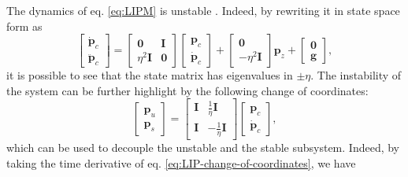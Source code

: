 The dynamics of eq. \eqref{eq:LIPM} is unstable \cite{Scianca2020TRO}. Indeed,
by rewriting it in state space form as
\begin{equation}
    \label{eq:LIPM-state-space}
    \begin{bmatrix}
        \dot{\bm{p}}_c \\ \ddot{\bm{p}}_c
    \end{bmatrix}
    =
    \begin{bmatrix}
        \bm{0}        & \bm{I} \\
        \eta^2 \bm{I} & \bm{0}
    \end{bmatrix}
    \begin{bmatrix}
        \bm{p}_c \\ \dot{\bm{p}}_c
    \end{bmatrix}
    +
    \begin{bmatrix}
        \bm{0} \\ -\eta^2 \bm{I}
    \end{bmatrix}
    \bm{p}_z 
    +
    \begin{bmatrix}
        \bm{0} \\ \bm{g}
    \end{bmatrix},
\end{equation}
it is possible to see that the state matrix has eigenvalues in $\pm\eta$.
The instability of the system
can be further highlight by the following change of coordinates:
\begin{equation}
    \label{eq:LIP-change-of-coordinates}
    \begin{bmatrix}
        \bm{p}_u \\ \bm{p}_s
    \end{bmatrix}
    =
    \begin{bmatrix}
        \bm{I} &  \frac{1}{\eta} \bm{I} \\
        \bm{I} & -\frac{1}{\eta} \bm{I}
    \end{bmatrix}
    \begin{bmatrix}
        \bm{p}_c\\ \dot{\bm{p}}_c
    \end{bmatrix},
\end{equation}
which can be used to decouple the unstable and the stable subsystem. Indeed,
by taking the time derivative of eq. \eqref{eq:LIP-change-of-coordinates}, we
have

